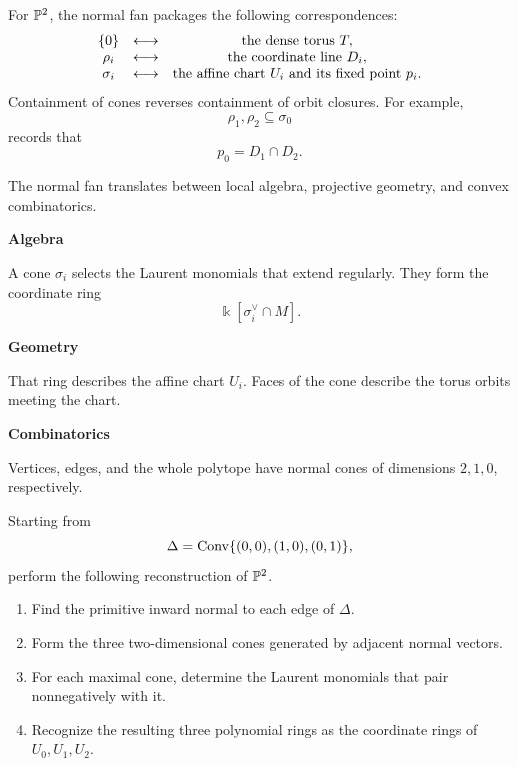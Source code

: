 For \(\mathbb{P}^2\), the normal fan packages the following correspondences:
\[
\begin{array}{c@{\quad\longleftrightarrow\quad}c}
\{0\} & \text{the dense torus }T,\\
\rho_i & \text{the coordinate line }D_i,\\
\sigma_i & \text{the affine chart }U_i
            \text{ and its fixed point }p_i.
\end{array}
\]
Containment of cones reverses containment of orbit closures. For
example,
\[
\rho_1,\rho_2\subseteq\sigma_0
\]
records that
\[
p_0=D_1\cap D_2.
\]

\begin{threedictionaries}
The normal fan translates between local algebra, projective geometry,
and convex combinatorics.

\medskip

\noindent
\begin{minipage}[t]{0.30\linewidth}
\centering
\textbf{Algebra}\par
\smallskip
A cone \(\sigma_i\) selects the Laurent monomials that extend
regularly. They form the coordinate ring
\[
\Bbbk[\sigma_i^\vee\cap M].
\]
\end{minipage}
\hfill
\begin{minipage}[t]{0.30\linewidth}
\centering
\textbf{Geometry}\par
\smallskip
That ring describes the affine chart \(U_i\). Faces of the cone
describe the torus orbits meeting the chart.
\end{minipage}
\hfill
\begin{minipage}[t]{0.30\linewidth}
\centering
\textbf{Combinatorics}\par
\smallskip
Vertices, edges, and the whole polytope have normal cones of
dimensions \(2,1,0\), respectively.
\end{minipage}
\end{threedictionaries}

\begin{surfacelaboratory}
Starting from
\[
\Delta=\operatorname{Conv}\{(0,0),(1,0),(0,1)\},
\]
perform the following reconstruction of \(\mathbb{P}^2\).

\begin{enumerate}
\item Find the primitive inward normal to each edge of \(\Delta\).
\item Form the three two-dimensional cones generated by adjacent
normal vectors.
\item For each maximal cone, determine the Laurent monomials that pair
nonnegatively with it.
\item Recognize the resulting three polynomial rings as the coordinate
rings of \(U_0,U_1,U_2\).
\end{enumerate}
\end{surfacelaboratory}

